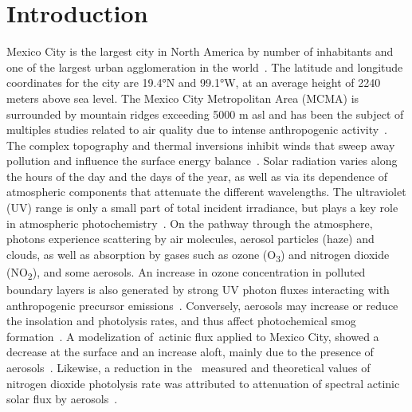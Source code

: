 \documentclass{article}
\begin{document}
\section*{Introduction}

{\label{874460}}

Mexico City is the largest city in North America by number of
inhabitants and one of the largest urban agglomeration in the
world~\cite{2014a}. The latitude and longitude coordinates for the
city are 19.4°N and 99.1°W, at an average height of 2240 meters above
sea level. The Mexico City Metropolitan Area (MCMA) is surrounded by
mountain ridges exceeding 5000 m asl and has been the subject of
multiples studies related to air quality due to intense anthropogenic
activity~\cite{coauthors1998,Molina_2007,Molina_2010,Tzompa_Sosa_2017}. The complex topography and thermal
inversions inhibit winds that sweep away pollution and influence the
surface energy balance~\cite{Whiteman_2000,juregui-ostos2005,Zhang_2009}. Solar radiation varies along
the hours of the day and the days of the year, as well as via its
dependence of atmospheric components that attenuate the different
wavelengths. The ultraviolet (UV) range is only a small part of total
incident irradiance, but plays a key role in atmospheric
photochemistry~\cite{LEIGHTON_1961,pandis2016}. On the pathway through the
atmosphere, photons experience scattering by air molecules, aerosol
particles (haze) and clouds, as well as absorption by gases such as
ozone (O\textsubscript{3}) and nitrogen dioxide (NO\textsubscript{2}),
and some aerosols. An increase in ozone concentration in polluted
boundary layers is also generated by strong UV photon fluxes interacting
with anthropogenic precursor emissions~\cite{LEIGHTON_1961,Finlayson_Pitts_2000}. Conversely,
aerosols may increase or reduce the insolation and photolysis rates, and
thus affect photochemical smog formation~\cite{Dickerson_1997}. A
modelization of~actinic flux applied to Mexico City, showed a decrease
at the surface and an increase aloft, mainly due to the presence of
aerosols~\cite{Palancar_2012}. Likewise, a reduction in the~ measured and
theoretical values of nitrogen dioxide photolysis rate was attributed to
attenuation of spectral actinic solar flux by
aerosols~\cite{Castro_2001}.
\end{document}
